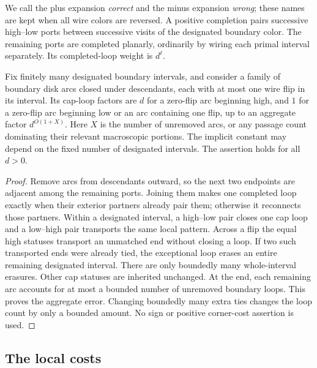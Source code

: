 We call the plus expansion \emph{correct} and the minus expansion
\emph{wrong}; these names are kept when all wire colors are reversed.
A positive completion pairs successive high--low ports between
successive visits of the designated boundary color. The remaining
ports are completed planarly, ordinarily by wiring each primal
interval separately. Its completed-loop weight is \(d^\ell\).

\begin{lemma}\label{physical:cap-elimination}
Fix finitely many designated boundary intervals, and consider a family
of boundary disk arcs closed under descendants, each with at most one
wire flip in its interval. Its cap-loop factors
are \(d\) for a zero-flip arc beginning high, and \(1\) for a
zero-flip arc beginning low or an arc containing one flip, up to
an aggregate factor \(d^{O(1+X)}\). Here \(X\) is the number of
unremoved arcs, or any passage count dominating their relevant
macroscopic portions. The implicit constant may depend on the fixed
number of designated intervals. The assertion holds for all \(d>0\).
\end{lemma}

\begin{proof}
Remove arcs from descendants outward, so the next two endpoints are
adjacent among the remaining ports. Joining them makes one completed
loop exactly when their exterior partners already pair them;
otherwise it reconnects those partners. Within a designated interval,
a high--low pair closes one cap loop and a low--high pair transports
the same local pattern. Across a flip the equal high statuses
transport an unmatched end without closing a loop. If two such
transported ends were already tied, the exceptional loop erases an
entire remaining designated interval. There are only boundedly many
whole-interval erasures. Other cap statuses are inherited unchanged.
At the end, each remaining arc accounts for at most a bounded number
of unremoved boundary loops. This proves the aggregate error.
Changing boundedly many extra ties changes the loop count by only
a bounded amount. No sign or positive corner-cost assertion is used.
\end{proof}

\subsection{The local costs}

